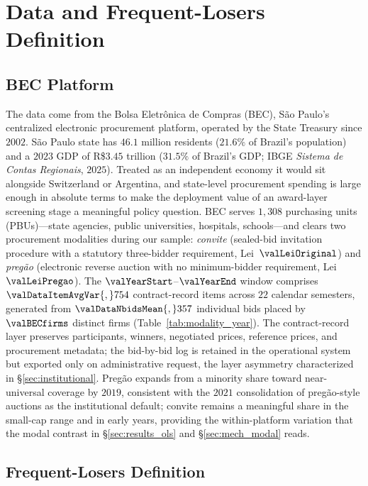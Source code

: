 \section{Data and Frequent-Losers Definition}
\label{sec:data}

\subsection{BEC Platform}
\label{sec:data_bec}

The data come from the Bolsa Eletr\^onica de Compras (BEC), São
Paulo's centralized electronic procurement platform, operated by
the State Treasury since $2002$. São Paulo state has $46.1$
million residents ($21.6\%$ of Brazil's population) and a
$2023$ GDP of R\$$3.45$ trillion ($31.5\%$ of Brazil's GDP; IBGE
\emph{Sistema de Contas Regionais}, $2025$). Treated as an
independent economy it would sit alongside Switzerland or
Argentina, and state-level procurement spending is large enough
in absolute terms to make the deployment value of an award-layer
screening stage a meaningful policy question. BEC serves $1{,}308$
purchasing units (PBUs)---state agencies, public universities,
hospitals, schools---and clears two procurement modalities during
our sample: \emph{convite} (sealed-bid invitation procedure with
a statutory three-bidder requirement, Lei~$\valLeiOriginal$) and
\emph{preg\~ao} (electronic reverse auction with no
minimum-bidder requirement, Lei~$\valLeiPregao$). The
$\valYearStart$--$\valYearEnd$ window comprises
$\valDataItemAvgVar{,}754$ contract-record items across $22$
calendar semesters, generated from $\valDataNbidsMean{,}357$
individual bids placed by $\valBECfirms$ distinct firms
(Table~\ref{tab:modality_year}). The contract-record layer
preserves participants, winners, negotiated prices, reference
prices, and procurement metadata; the bid-by-bid log is retained
in the operational system but exported only on administrative
request, the layer asymmetry characterized in
\S\ref{sec:institutional}. Preg\~ao expands from a minority share
toward near-universal coverage by $2019$, consistent with the
$2021$ consolidation of preg\~ao-style auctions as the
institutional default; convite remains a meaningful share in the
small-cap range and in early years, providing the within-platform
variation that the modal contrast in \S\ref{sec:results_ols} and
\S\ref{sec:mech_modal} reads.

\subsection{Frequent-Losers Definition}
\label{sec:fl_definition}

